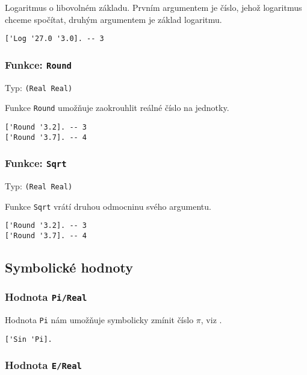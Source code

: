 Logaritmus o libovolném základu. Prvním argumentem je číslo, jehož logaritmus chceme spočítat,
druhým argumentem je základ logaritmu.

\begin{lstlisting}[caption={Ukázka využití Log}]
['Log '27.0 '3.0]. -- 3
\end{lstlisting}

\subsubsection*{Funkce: \lstinline{Round}}
Typ: \lstinline{(Real Real)}

Funkce \lstinline{Round} umožňuje zaokrouhlit reálné číslo na jednotky.

\begin{lstlisting}[caption={Ukázka využití Round}]
['Round '3.2]. -- 3
['Round '3.7]. -- 4
\end{lstlisting}

\subsubsection*{Funkce: \lstinline{Sqrt}}
Typ: \lstinline{(Real Real)}

Funkce \lstinline{Sqrt} vrátí druhou odmocninu svého argumentu.

\begin{lstlisting}[caption={Ukázka využití Round}]
['Round '3.2]. -- 3
['Round '3.7]. -- 4
\end{lstlisting}

\subsection{Symbolické hodnoty}

\subsubsection*{Hodnota \lstinline{Pi/Real}}

Hodnota \lstinline{Pi} nám umožňuje symbolicky zmínit číslo $\pi$, viz .

\begin{lstlisting}[caption={Ukázka využití Pi}]
['Sin 'Pi].
\end{lstlisting}

\subsubsection*{Hodnota \lstinline{E/Real}}

